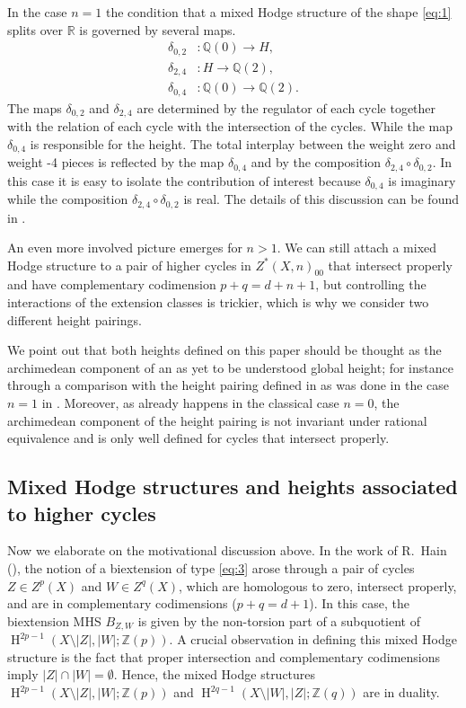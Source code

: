 \documentclass[11pt,a4paper]{amsart}
\newcommand{\Q}{\mathds{Q}}
\newcommand{\R}{\mathds{R}}
\newcommand{\Z}{\mathds{Z}}
\DeclareMathOperator{\rH}{H}
\numberwithin{equation}{section}
\theoremstyle{plain}
\theoremstyle{definition}
\begin{document}
In the case $n=1$ the condition that a mixed Hodge structure of the shape
\eqref{eq:1} splits over $\R$ is governed by several maps.
\begin{align*}
  \delta _{0,2}&\colon \Q(0)\longrightarrow H,\\
  \delta _{2,4}&\colon H\longrightarrow \Q(2),\\
  \delta _{0,4}&\colon \Q(0)\longrightarrow \Q(2).
\end{align*}
The maps $\delta _{0,2}$ and $\delta _{2,4}$ are determined by the
regulator of each cycle together with the 
relation of each cycle with the intersection of the cycles. While the map $\delta
_{0,4}$ is responsible for the height.  The total
interplay between the weight zero and weight -4 pieces is reflected by
the map $\delta _{0,4}$ and by the composition $\delta _{2,4}\circ
\delta _{0,2}$. In this case it is easy to isolate the contribution of
interest because  $\delta _{0,4}$ is imaginary while the
composition  $\delta _{2,4}\circ
\delta _{0,2}$ is real. The details of this discussion can be found in \cite[\S 4]{BGGP:Height}.

An even more involved picture emerges for $n>1$.
We can still attach a mixed Hodge structure to a pair of
higher cycles in $Z^{\ast}(X, n)_{00}$ that intersect properly and
have complementary codimension $p+q=d+n+1$, but controlling the
interactions of the extension classes is trickier, which is why we
consider two different height pairings.

We point out that both heights defined on this paper should be thought
as the archimedean component of an as yet to be understood global
height; for instance through a comparison with the height pairing defined
in \cite{Burgoswami:hait} as was done in the case $n=1$ in
\cite{BGGP:Height}. Moreover, as already happens in the classical case $n=0$,
the  
archimedean component of the height pairing is not invariant under
rational equivalence and is only well defined for cycles that
intersect properly. 

\subsection*{Mixed Hodge structures and heights associated to higher cycles}
Now we elaborate on the motivational discussion above. In the work of R.~Hain (\cite{Hain:Height}), the notion of a
biextension of type \eqref{eq:3} arose through a pair of cycles
$Z\in Z^{p}(X)$ and $W\in Z^{q}(X)$, which are homologous to zero,
intersect properly, and are in complementary codimensions
($p+q=d+1$). In this case, the biextension MHS $B_{Z,W}$ is given by
the non-torsion part of a subquotient of
$\rH^{2p-1}(X\setminus |Z|,|W|; \Z(p))$. A crucial observation in
defining this mixed Hodge structure is the fact that proper
intersection and complementary codimensions imply
$|Z|\cap |W|=\emptyset$. Hence, the mixed Hodge structures
$\rH^{2p-1}(X\setminus |Z|,|W|; \Z(p))$ and
$\rH^{2q-1}(X\setminus |W|,|Z|; \Z(q))$ are in duality.
\end{document}
